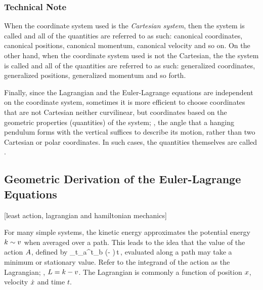 \subsubsection{Technical Note}
When the coordinate system used is the \emph{Cartesian system}, then the system is called  and all of the quantities are referred to as such: canonical coordinates, canonical positions, canonical momentum, canonical velocity and so on. On the other hand, when the coordinate system used is not the Cartesian, the the system is called  and all of the quantities are referred to as such: generalized coordinates, generalized positions, generalized momentum and so forth.

Finally, since the Lagrangian and the Euler-Lagrange equations are independent on the coordinate system, sometimes it is more efficient to choose coordinates that are not Cartesian neither curvilinear, but coordinates based on the geometric properties (quantities) of the system; \ie, the angle that a hanging pendulum forms with the vertical suffices to describe its motion, rather than two Cartesian or polar coordinates. In such cases, the quantities themselves are called .


\subsection{Geometric Derivation of the Euler-Lagrange Equations}
[least action, lagrangian and hamiltonian mechanics]

For many simple systems, the kinetic energy approximates the potential energy $k\sim v$ when averaged over a path. This leads to the idea that the value of the action $A$, defined by
\beq
\action {} \int_{t_a}^{t_b} (\ken - \pen)\,\dx t\,,
\eeq
evaluated along a path may take a minimum or stationary value. Refer to the integrand of the action as the Lagrangian; \ie, $L = k - v$. The Lagrangian is commonly a function of position $x$, velocity $\dot{x}$ and time $t$.

